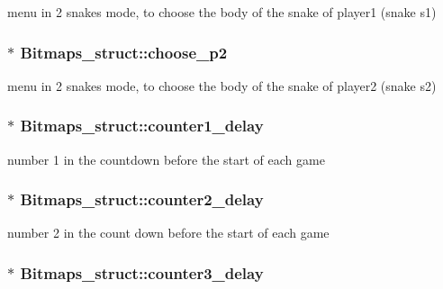 menu in 2 snakes mode, to choose the body of the snake of player1 (snake s1) 

\subsubsection[{\texorpdfstring{choose\+\_\+p2}{choose_p2}}]{$\ast$ Bitmaps\+\_\+struct\+::choose\+\_\+p2}\hypertarget{group__graphics_gabe0652c58a65bf0ccd93497ab08d9cfb}{}\label{group__graphics_gabe0652c58a65bf0ccd93497ab08d9cfb}


menu in 2 snakes mode, to choose the body of the snake of player2 (snake s2) 

\subsubsection[{\texorpdfstring{counter1\+\_\+delay}{counter1_delay}}]{$\ast$ Bitmaps\+\_\+struct\+::counter1\+\_\+delay}\hypertarget{group__graphics_ga0d2f0b6ce3ed9e3fbdca9fb0e2197c8f}{}\label{group__graphics_ga0d2f0b6ce3ed9e3fbdca9fb0e2197c8f}


number 1 in the countdown before the start of each game 

\subsubsection[{\texorpdfstring{counter2\+\_\+delay}{counter2_delay}}]{$\ast$ Bitmaps\+\_\+struct\+::counter2\+\_\+delay}\hypertarget{group__graphics_gabbfd3197d8f58f68356e4c404c9b41a7}{}\label{group__graphics_gabbfd3197d8f58f68356e4c404c9b41a7}


number 2 in the count down before the start of each game 

\subsubsection[{\texorpdfstring{counter3\+\_\+delay}{counter3_delay}}]{$\ast$ Bitmaps\+\_\+struct\+::counter3\+\_\+delay}\hypertarget{group__graphics_gac1063b5ae836e49a51d16a672c9cc11f}{}\label{group__graphics_gac1063b5ae836e49a51d16a672c9cc11f}


